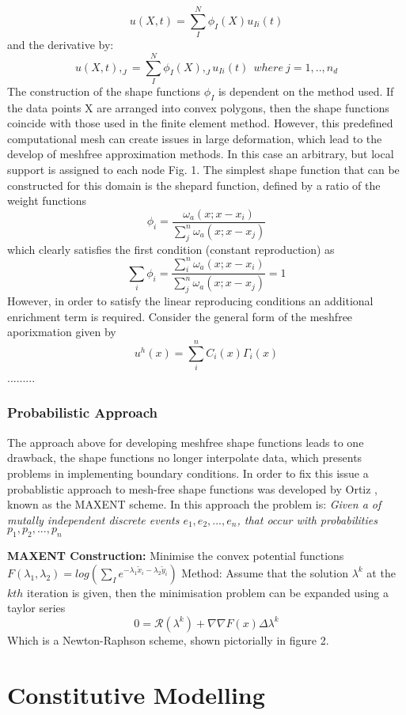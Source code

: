 \begin{equation}
u(X,t) = \sum_I^N \phi_I(X) u_{Ii}(t)
\end{equation}
and the derivative by:
\begin{equation}
u(X,t),_J = \sum_I^N \phi_I(X),_J u_{Ii}(t) ~~where~j = 1,..,n_d
\end{equation}
The construction of the shape functions $\phi_I$ is dependent on the method used. If the data points X are arranged into convex polygons, then the shape functions coincide with those used in the finite element method. However, this predefined computational mesh can create issues in large deformation, which lead to the develop of meshfree approximation methods. In this case an arbitrary, but local support is assigned to each node Fig. 1. The simplest shape function that can be constructed for this domain is the shepard function, defined by a ratio of the weight functions
\begin{equation}
\phi_i = \frac{\omega_a (x; x-x_i)}{\sum_j^n \omega_a(x;x-x_j)} 
\end{equation}
which clearly satisfies the first condition (constant reproduction) as
\begin{equation}
\sum_i \phi_i = \frac{\sum_i^n\omega_a (x; x-x_i)}{\sum_j^n \omega_a(x;x-x_j)} = 1
\end{equation}
However, in order to satisfy the linear reproducing conditions an additional enrichment term is required. Consider the general form of the meshfree aporixmation given by 
\begin{equation}
u^h(x) = \sum_i^n C_i(x) \Gamma_i(x)
\end{equation}
.........



\subsubsection*{Probabilistic Approach}
The approach above for developing meshfree shape functions leads to one drawback, the shape functions no longer interpolate data, which presents problems in implementing boundary conditions. In order to fix this issue a probablistic approach to mesh-free shape functions was developed by Ortiz \cite{}, known as the MAXENT scheme. In this approach the problem is: \emph{Given a of mutally independent discrete events $e_1,e_2,...,e_n$, that occur with probabilities $p_1,p_2,...,p_n$}

\begin{tcolorbox}
\textbf{MAXENT Construction:}
Minimise the convex potential functions $F(\lambda_1,\lambda_2) = log(\sum_I e^{-\lambda_1 \tilde{x}_i - \lambda_2 \tilde{y}_i})$ Method: Assume that the solution $\lambda^k$ at the $kth$ iteration is given, then the minimisation problem can be expanded using a taylor series
\begin{equation*}
0 = \mathcal{R}(\lambda^k) + \nabla \nabla F(x) \Delta \lambda^k
\end{equation*}
Which is a Newton-Raphson scheme, shown pictorially in figure 2.
\end{tcolorbox}
\section{Constitutive Modelling}

